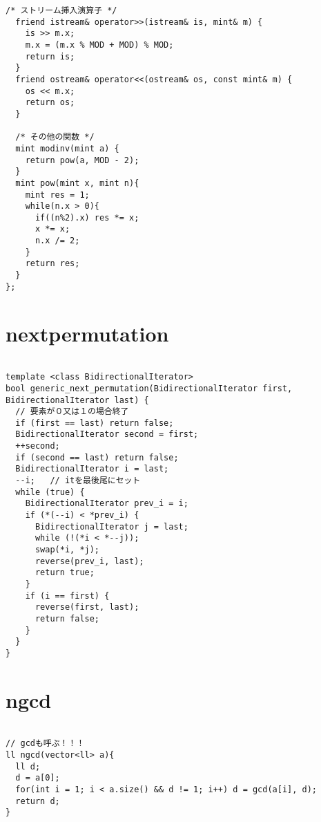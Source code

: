 \documentclass[a4j,titlepage]{jarticle} %
\begin{document}
\begin{lstlisting}[caption=modint]
  /* ストリーム挿入演算子 */
  friend istream& operator>>(istream& is, mint& m) {
    is >> m.x;
    m.x = (m.x % MOD + MOD) % MOD;
    return is;
  }
  friend ostream& operator<<(ostream& os, const mint& m) {
    os << m.x;
    return os;
  }

  /* その他の関数 */
  mint modinv(mint a) {
    return pow(a, MOD - 2);
  }
  mint pow(mint x, mint n){
    mint res = 1;
    while(n.x > 0){
      if((n%2).x) res *= x;
      x *= x;
      n.x /= 2;
    }
    return res;
  }
};

\end{lstlisting}

\color{white}
\section{nextpermutation}
\color{black}
\begin{lstlisting}[caption=nextpermutation]

template <class BidirectionalIterator>
bool generic_next_permutation(BidirectionalIterator first, BidirectionalIterator last) {
  // 要素が０又は１の場合終了
  if (first == last) return false;
  BidirectionalIterator second = first;
  ++second;
  if (second == last) return false;
  BidirectionalIterator i = last;
  --i;   // itを最後尾にセット
  while (true) {
    BidirectionalIterator prev_i = i;
    if (*(--i) < *prev_i) {
      BidirectionalIterator j = last;
      while (!(*i < *--j));
      swap(*i, *j);
      reverse(prev_i, last);
      return true;
    }
    if (i == first) {
      reverse(first, last);
      return false;
    }
  }
}

\end{lstlisting}

\color{white}
\section{ngcd}
\color{black}
\begin{lstlisting}[caption=ngcd]

// gcdも呼ぶ！！！
ll ngcd(vector<ll> a){
  ll d;
  d = a[0];
  for(int i = 1; i < a.size() && d != 1; i++) d = gcd(a[i], d);
  return d;
}

\end{lstlisting}

\color{white}
\end{document}
